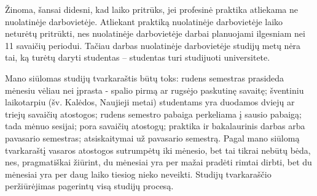Žinoma, šansai didesni, kad laiko pritrūks, jei profesinė praktika atliekama ne nuolatinėje darbovietėje. Atliekant praktiką nuolatinėje darbovietėje laiko neturėtų pritrūkti, nes nuolatinėje darbovietėje darbai planuojami ilgesniam nei 11 savaičių periodui. Tačiau darbas nuolatinėje darbovietėje studijų metų nėra tai, ką turėtų daryti studentas -- studentas turi studijuoti universitete.

Mano siūlomas studijų tvarkaraštis būtų toks: rudens semestras prasideda mėnesiu vėliau nei įprasta - spalio pirmą ar rugsėjo paskutinę savaitę; šventiniu laikotarpiu (šv. Kalėdos, Naujieji metai) studentams yra duodamos dviejų ar triejų savaičių atostogos; rudens semestro pabaiga perkeliama į sausio pabaigą; tada mėnuo sesijai; pora savaičių atostogų; praktika ir bakalaurinis darbas arba pavasario semestras; atsiskaitymai už pavasario semestrą. Pagal mano siūlomą tvarkaraštį vasaros atostogos sutrumpėtų iki mėnesio, bet tai tikrai nebūtų bėda, nes, pragmatiškai žiūrint, du mėnesiai yra per mažai pradėti rimtai dirbti, bet du mėnesiai yra per daug laiko tiesiog nieko neveikti. Studijų tvarkaraščio peržiūrėjimas pagerintų visą studijų procesą. 